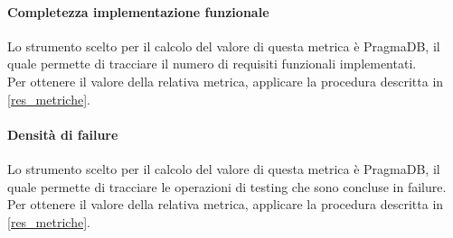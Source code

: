 \paragraph{Completezza implementazione funzionale}
Lo strumento scelto per il calcolo del valore di questa metrica è PragmaDB, il quale permette di tracciare il numero di requisiti funzionali implementati.\\
Per ottenere il valore della relativa metrica, applicare la procedura descritta in \ref{res_metriche}.
\paragraph{Densità di failure}
Lo strumento scelto per il calcolo del valore di questa metrica è PragmaDB, il quale permette di tracciare le operazioni di testing che sono concluse in failure.\\
Per ottenere il valore della relativa metrica, applicare la procedura descritta in \ref{res_metriche}.

